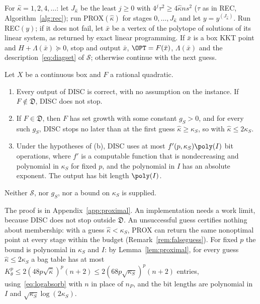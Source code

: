 \begin{algorithm}\label{alg:disc}
For $\hat\kappa=1,2,4,\dots$: let $J_{\hat\kappa}$ be the least $j\ge0$ with
$4^j\tau^2\ge4\hat\kappa ns^2$ ($\tau$ as in REC, Algorithm~\ref{alg:rec});
run PROX$(\hat\kappa)$ for stages $0,\dots,J_{\hat\kappa}$ and let
$y=y^{(J_{\hat\kappa})}$. Run REC$(y)$; if it does not fail, let $\bar x$ be
a vertex of the polytope of solutions of its linear system, as returned by
exact linear programming. If $\bar x$ is a box KKT point and
$H+\Lambda(\bar x)\succeq0$, stop and output $\bar x$, $\OPT=F(\bar x)$,
$\Lambda(\bar x)$ and the description~\eqref{eq:diagset} of $\mathcal S$;
otherwise continue with the next guess.
\end{algorithm}

\begin{theorem}\label{thm:diagdiscovery}
Let $X$ be a continuous box and $F$ a rational quadratic.
\begin{enumerate}[label=(\alph*)]
\item Every output of DISC is correct, with no assumption on the instance.
If $F\notin\mathfrak D$, DISC does not stop.
\item If $F\in\mathfrak D$, then $F$ has set growth with some constant
$g_S>0$, and for every such $g_S$, DISC stops no later than at the first
guess $\hat\kappa\ge\kappa_S$, so with $\hat\kappa\le2\kappa_S$.
\item Under the hypotheses of (b), DISC uses at most $f'(p,\kappa_S)\poly(I)$
bit operations, where $f'$ is a computable function that is nondecreasing
and polynomial in $\kappa_S$ for fixed $p$, and the polynomial in $I$ has an
absolute exponent. The output has bit length $\poly(I)$.
\end{enumerate}
Neither $\mathcal S$, nor $g_S$, nor a bound on $\kappa_S$ is supplied.
\end{theorem}

The proof is in Appendix~\ref{app:proximal}. An implementation needs a work
limit, because DISC does not stop outside $\mathfrak D$. An unsuccessful
guess certifies nothing about membership: with a guess $\hat\kappa<\kappa_S$,
PROX can return the same nonoptimal point at every stage within the budget
(Remark~\ref{rem:falseguess}). For fixed $p$ the bound is polynomial in
$\kappa_S$ and $I$: by Lemma~\ref{lem:proximal}, for every guess
$\hat\kappa\le2\kappa_S$ a bag table has at most
$K_\theta^p\le2(48p\sqrt{\hat\kappa})^p(n+2)\le2(68p\sqrt{\kappa_S})^p(n+2)$
entries, using~\eqref{eq:logabsorb} with $n$ in place of $n_P$, and the bit
lengths are polynomial in $I$ and $\sqrt{\kappa_S}\log(2\kappa_S)$.

